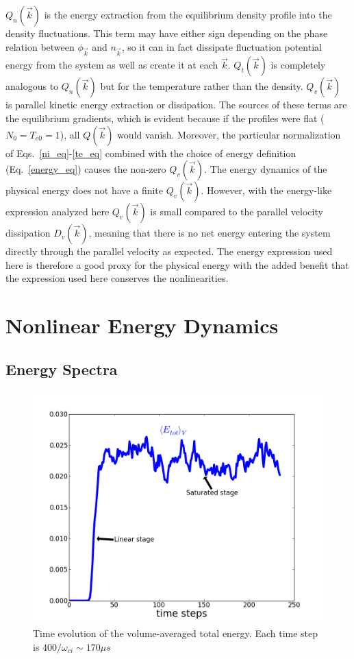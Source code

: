 \documentclass[showpacs,preprintnumbers,amsmath,amssymb,superscriptaddress,aip]{revtex4-1}
\begin{document}
$Q_n(\vec{k})$ is the energy extraction from the equilibrium density profile into the density fluctuations. 
This term may have either sign depending on the phase relation between $\phi_{\vec{k}}$ and $n_{\vec{k}}$, 
so it can in fact dissipate fluctuation potential energy from the system as well as create it
at each $\vec{k}$. $Q_t(\vec{k})$ is completely analogous to $Q_n(\vec{k})$ but for the temperature rather than the density. 
$Q_v(\vec{k})$ is parallel kinetic energy extraction or dissipation.
The sources of these terms are the equilibrium gradients, which is evident because if the profiles
were flat ($N_0=T_{e0}=1$), all $Q(\vec{k})$ would vanish.
Moreover, the particular normalization of Eqs.~\ref{ni_eq}-\ref{te_eq} combined with the choice of energy definition (Eq.~\ref{energy_eq}) causes the non-zero $Q_v(\vec{k})$.
The energy dynamics of the physical energy does not have a finite $Q_v(\vec{k})$. However, with the energy-like expression analyzed here $Q_v(\vec{k})$ is small compared to the 
parallel velocity dissipation $D_v(\vec{k})$, meaning that there is no net energy entering the system directly through the parallel velocity as expected. 
The energy expression used here is therefore a good proxy for the physical energy with the added benefit that the expression used here conserves the nonlinearities.


\section{Nonlinear Energy Dynamics}
\label{nl_en_dynamics_sec}

\subsection{Energy Spectra}

\begin{figure}[!htbp]
\includegraphics[]{time_evolution}
\hfil
\caption{Time evolution of the volume-averaged total energy. Each time step is $400/\omega_{ci} \sim 170 \mu s$}
\label{time_evolution}
\end{figure}
\end{document}
